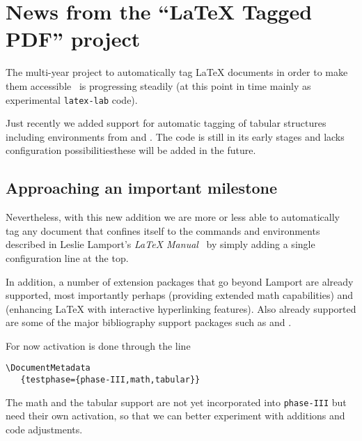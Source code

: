 \documentclass{ltnews}
\providecommand\Dash {\unskip \textemdash}
\let\finalpagebreak\pagebreak %
\providecommand\tubcommand[1]{}
\begin{document}
\tubcommand{\addtolength\textheight{4.2pc}}   %

\maketitle
{  \spaceskip=3.33pt 
\tableofcontents}

\setlength{}

\medskip



\section{News from the \enquote{\LaTeX{} Tagged PDF} project}

The multi-year project to automatically tag \LaTeX{} documents in
order to make them accessible~\cite{38:blueprint} is progressing
steadily (at this point in time mainly as experimental
\texttt{latex-lab} code).

Just recently we added support for automatic tagging of tabular
structures including environments from  and
. The code is still in its early stages and lacks
configuration possibilities\Dash these will be added in the future.

\subsection{Approaching an important milestone}

Nevertheless, with this new addition we are more or less able to
automatically tag any document that confines itself to the commands
and environments described in Leslie Lamport's \emph{\LaTeX{}
Manual}~\cite{38:Lamport} by simply adding a single configuration line
at the top.

In addition, a number of extension packages that go beyond Lamport are
already supported, most importantly perhaps  (providing
extended math capabilities) and  (enhancing \LaTeX{}
with interactive hyperlinking features).
\finalpagebreak
Also already supported are
some of the major bibliography support packages such as 
and .

For now activation is done through the line
\begin{verbatim}
\DocumentMetadata
   {testphase={phase-III,math,tabular}}
\end{verbatim}
The math and the tabular support are not yet incorporated into
\texttt{phase-III} but need their own activation, so that we can
better experiment with additions and code adjustments.
\end{document}
